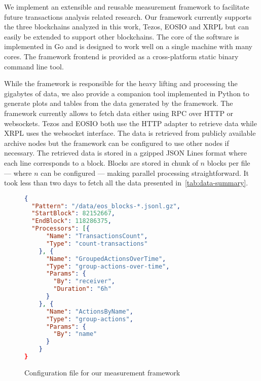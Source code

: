 We implement an extensible and reusable measurement framework to facilitate future transactions analysis related research.
Our framework currently supports the three blockchains analyzed in this work, Tezos, EOSIO and XRPL but can easily be extended to support other blockchains.
The core of the software is implemented in Go and is designed to work well on a single machine with many cores.
The framework frontend is provided as a cross-platform static binary command line tool.

While the framework is responsible for the heavy lifting and processing the gigabytes of data, we also provide a companion tool implemented in Python to generate plots and tables from the data generated by the framework.
The framework currently allows to fetch data either using RPC over HTTP or websockets.
Tezos and EOSIO both use the HTTP adapter to retrieve data while XRPL uses the websocket interface.
The data is retrieved from publicly available archive nodes but the framework can be configured to use other nodes if necessary.
The retrieved data is stored in a gzipped JSON Lines format where each line corresponds to a block. Blocks are stored in chunk of $n$ blocks per file --- where $n$ can be configured --- making parallel processing straightforward. It took less than two days to fetch all the data presented in~\autoref{tab:data-summary}.

\begin{figure}[h!]
\begin{lstlisting}[language=json]
{
  "Pattern": "/data/eos_blocks-*.jsonl.gz",
  "StartBlock": 82152667,
  "EndBlock": 118286375,
  "Processors": [{
      "Name": "TransactionsCount",
      "Type": "count-transactions"
    }, {
      "Name": "GroupedActionsOverTime",
      "Type": "group-actions-over-time",
      "Params": {
        "By": "receiver",
        "Duration": "6h"
      }
    }, {
      "Name": "ActionsByName",
      "Type": "group-actions",
      "Params": {
        "By": "name"
      }
    }
}
\end{lstlisting}
  \caption{Configuration file for our measurement framework}
  \label{lis:framework-config}
\end{figure}

